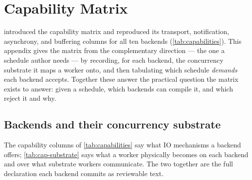 \chapter{Capability Matrix}\label{app:capability-matrix}

 introduced the capability matrix and reproduced its
transport, notification, asynchrony, and buffering columns for all ten backends
(\cref{tab:capabilities}). This appendix gives the matrix from the complementary
direction --- the one a schedule author needs --- by recording, for each backend,
the concurrency substrate it maps a worker onto, and then tabulating which schedule
\emph{demands} each backend accepts. Together these answer the practical question
the matrix exists to answer: given a schedule, which backends can compile it, and
which reject it and why.

\section{Backends and their concurrency substrate}

The capability columns of \cref{tab:capabilities} say what IO mechanisms a backend
offers; \cref{tab:cap-substrate} says what a worker physically becomes on each
backend and over what substrate workers communicate. The two together are the full
declaration each backend commits as reviewable text.

